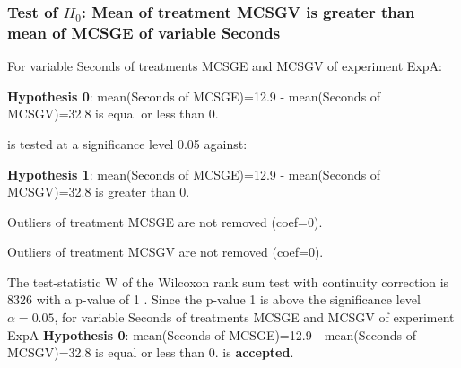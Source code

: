 \begin{frame}[t]
 \frametitle{Test of $H_{0}$: Mean of treatment MCSGV is greater than mean of MCSGE of variable Seconds }
 \scriptsize
 For variable Seconds of treatments MCSGE and MCSGV of experiment ExpA:

\vspace{1mm}
{\bf Hypothesis 0}: mean(Seconds of MCSGE)=12.9 - mean(Seconds of MCSGV)=32.8 is equal or less than 0.


 \begin{center} is tested at a significance level 0.05 against: \end{center}

{\bf Hypothesis 1}: mean(Seconds of MCSGE)=12.9 - mean(Seconds of MCSGV)=32.8 is greater than 0.
\vspace{1mm}
\vspace{1mm}

 Outliers of treatment MCSGE  are not removed (coef=0).

 Outliers of treatment MCSGV  are not removed (coef=0).
\vspace{1mm}
 
 The test-statistic W of the Wilcoxon rank sum test with continuity correction is 8326 with a p-value of 1 .
 Since the p-value 1 is above the significance level $\alpha= 0.05 $,
 for variable Seconds of treatments MCSGE and MCSGV of experiment ExpA 
 {\bf Hypothesis 0}: mean(Seconds of MCSGE)=12.9 - mean(Seconds of MCSGV)=32.8 is equal or less than 0.
is {\bf accepted}.

 \end{frame}
